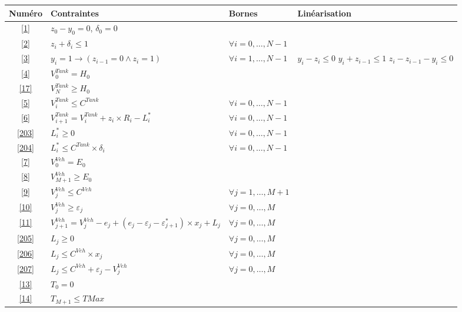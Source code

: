 \begin{table}[H]
	\centering
	\begin{tabular}{|c|m{6cm}|m{3cm}|m{6cm}|}
		\hline
		\rowcolor{cyan}	Numéro&	Contraintes &Bornes & Linéarisation \\ 
		\hline
		\ref{1}&$z_{0}- y_0=0$, $\delta_0=0$& &  \\
		\hline
		\ref{2}	&$z_i+\delta_i\leq 1$& $\forall i= 0, \dots, N-1$& \\
		\hline
		\ref{3} & $y_i=1 \rightarrow (z_{i-1}=0 \land z_i=1) $ & $\forall i= 1, \dots, N-1$ & \newline  $y_i-z_i\leq 0$ \newline $y_i+z_{i-1}\leq 1$ \newline  $z_i-z_{i-1}-y_i\leq 0$\\ 
		\hline
		\ref{4}	&$V^{Tank}_{0}= H_0$&   &\\
		\hline
		\ref{17}&	$V_{N}^{Tank}\geq H_{0}$&   &\\
		\hline
		\ref{5}&	$V^{Tank}_{i}\leq C^{Tank} $ &$\forall i= 0, \dots, N-1$ &\\
		\hline
		\ref{6}	&$V^{Tank}_{i+1}= V^{Tank}_{i}+z_i\times R_i -  L^*_i$  &$\forall i= 0, \dots, N-1$ & \\
		\hline
		\ref{203} & $ L^*_i \geq 0 $ & $\forall i = 0, \dots, N-1$& \\
		\hline
		\ref{204} &$L^*_i \leq  C^{Tank} \times \delta_i$   & $\forall i= 0, \dots, N-1 $&\\
		\hline	
		\ref{7}&$	V_{0}^{Veh}= E_0$&  & \\
		\hline
		\ref{8}&$	V_{M+1}^{Veh}\geq E_{0}$& & \\
		\hline	
		\ref{9}&$	V_{j}^{Veh}\leq C^{Veh}$&   $\forall j= 1, \dots, M+1$&\\
		\hline
		\ref{10}&	$V_{j}^{Veh}\geq\varepsilon_{j}$&   $\forall j= 0, \dots, M$&\\ 
		\hline
		\ref{11}& $V_{j+1}^{Veh}=V_{j}^{Veh}-e_j + (e_j-\varepsilon_j-\varepsilon^*_{j+1}) \times x_j  +L_j$&   $\forall j= 0, \dots, M$& \\
		\hline
		\ref{205}& $L_j \geq 0$  & $\forall j= 0, \dots, M$& \\
		\hline
		\ref{206}&$ L_j \leq C^{Veh} \times x_j$ &  $ \forall j= 0, \dots, M$ & \\
		\hline
		\ref{207}& $L_j \leq C^{Veh} + \varepsilon_{j}-V_{j}^{Veh}$ & $\forall j= 0, \dots, M $&\\
		\hline
		\ref{13}&	$T_{0}= 0$&  &\\ 
		\hline
		\ref{14}&	$T_{M+1}\leq TMax$&  & \\

\end{tabular}
\end{table}
